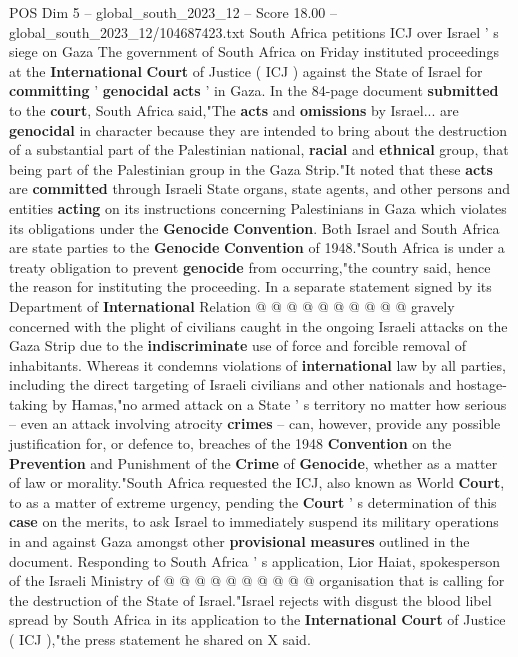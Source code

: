 \begin{textsample}{POS Dim 5 – global\_south\_2023\_12 – Score 18.00 – global\_south\_2023\_12/104687423.txt}  \label{ex:f5_pos_213}
South Africa petitions ICJ over Israel ' s siege on Gaza The government of South Africa on Friday instituted proceedings at the \textbf{International} \textbf{Court} of Justice ( ICJ ) against the State of Israel for \textbf{committing} ' \textbf{genocidal} \textbf{acts} ' in Gaza.
In the 84-page document \textbf{submitted} to the \textbf{court}, South Africa said,"The \textbf{acts} and \textbf{omissions} by Israel... are \textbf{genocidal} in character because they are intended to bring about the destruction of a substantial part of the Palestinian national, \textbf{racial} and \textbf{ethnical} group, that being part of the Palestinian group in the Gaza Strip."It noted that these \textbf{acts} are \textbf{committed} through Israeli State organs, state agents, and other persons and entities \textbf{acting} on its instructions concerning Palestinians in Gaza which violates its obligations under the \textbf{Genocide} \textbf{Convention}.
Both Israel and South Africa are state parties to the \textbf{Genocide} \textbf{Convention} of 1948."South Africa is under a treaty obligation to prevent \textbf{genocide} from occurring,"the country said, hence the reason for instituting the proceeding.
In a separate statement signed by its Department of \textbf{International} Relation @ @ @ @ @ @ @ @ @ @ gravely concerned with the plight of civilians caught in the ongoing Israeli attacks on the Gaza Strip due to the \textbf{indiscriminate} use of force and forcible removal of inhabitants.
Whereas it condemns violations of \textbf{international} law by all parties, including the direct targeting of Israeli civilians and other nationals and hostage-taking by Hamas,"no armed attack on a State ' s territory no matter how serious -- even an attack involving atrocity \textbf{crimes} -- can, however, provide any possible justification for, or defence to, breaches of the 1948 \textbf{Convention} on the \textbf{Prevention} and Punishment of the \textbf{Crime} of \textbf{Genocide}, whether as a matter of law or morality."South Africa requested the ICJ, also known as World \textbf{Court}, to as a matter of extreme urgency, pending the \textbf{Court} ' s determination of this \textbf{case} on the merits, to ask Israel to immediately suspend its military operations in and against Gaza amongst other \textbf{provisional} \textbf{measures} outlined in the document.
Responding to South Africa ' s application, Lior Haiat, spokesperson of the Israeli Ministry of @ @ @ @ @ @ @ @ @ @ organisation that is calling for the destruction of the State of Israel."Israel rejects with disgust the blood libel spread by South Africa in its application to the \textbf{International} \textbf{Court} of Justice ( ICJ ),"the press statement he shared on X said.

\end{textsample}
